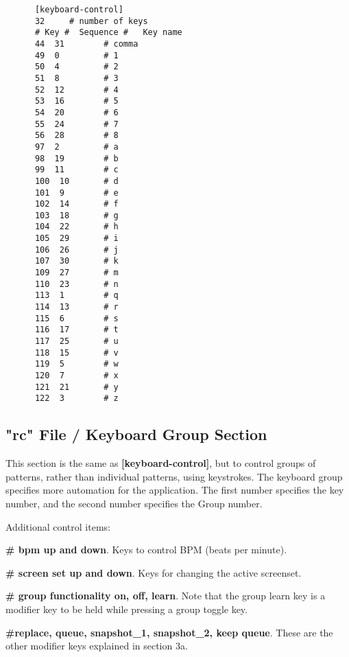    \begin{verbatim}
      [keyboard-control]
      32     # number of keys
      # Key #  Sequence #   Key name
      44  31        # comma
      49  0         # 1
      50  4         # 2
      51  8         # 3
      52  12        # 4
      53  16        # 5
      54  20        # 6
      55  24        # 7
      56  28        # 8
      97  2         # a
      98  19        # b
      99  11        # c
      100  10       # d
      101  9        # e
      102  14       # f
      103  18       # g
      104  22       # h
      105  29       # i
      106  26       # j
      107  30       # k
      109  27       # m
      110  23       # n
      113  1        # q
      114  13       # r
      115  6        # s
      116  17       # t
      117  25       # u
      118  15       # v
      119  5        # w
      120  7        # x
      121  21       # y
      122  3        # z
   \end{verbatim}

\subsection{"rc" File / Keyboard Group Section}
\label{subsec:seq66_rc_file_keyboard_group}

   This section is the same as
   \textbf{[keyboard-control]}, but to control groups of patterns, rather than
   individual patterns, using keystrokes.
   The keyboard group specifies more automation for the application.  The
   first number specifies the key number, and the second number specifies
   the Group number.

   Additional control items:

   \begin{enumber}
      \item \textbf{\# bpm up and down}.
         Keys to control BPM (beats per minute).
      \item \textbf{\# screen set up and down}.
         Keys for changing the active screenset.
      \item \textbf{\# group functionality on, off, learn}.
         Note that the group learn key is a modifier key to be held while 
         pressing a group toggle key.
      \item \textbf{\#replace, queue, snapshot\_1, snapshot\_2, keep queue}.
         These are the other modifier keys explained in section 3a.
   \end{enumber}

